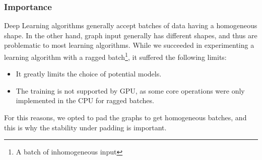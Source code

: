 \subsubsection{Importance}
Deep Learning algorithms generally accept batches of data having a homogeneous shape.
\newline In the other hand, graph input generally has different shapes, and thus are problematic to most learning algorithms.
\newline While we succeeded in experimenting a learning algorithm with a ragged batch\footnote{A batch of inhomogeneous input}, it suffered the following limits:
\begin{itemize}
	\item It greatly limits the choice of potential models. 
	\item The training is not supported by GPU, as some core operations were only implemented in the CPU for ragged batches.
\end{itemize}
For this reasons, we opted to pad the graphs to get homogeneous batches, and this is why the stability under padding is important.

